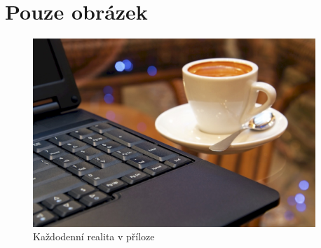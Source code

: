 \documentclass[english,master,public,dept460,male,cpdeclaration,oneside]{diploma}
\begin{document}
\section{Pouze obrázek}
\begin{figure}[!h]\centering\includegraphics[width=0.95\textwidth]{Figures/CoffeeAndComputer.jpg}\caption{Každodenní realita v příloze}\end{figure}
\end{document}
